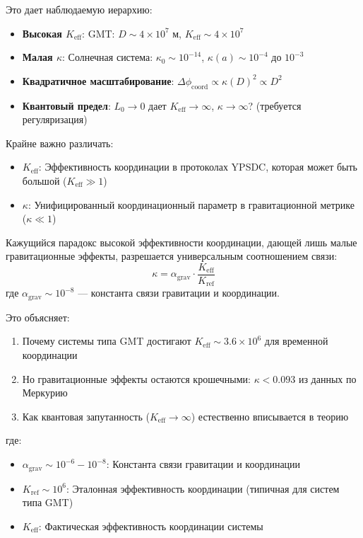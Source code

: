 \documentclass[11pt,a4paper]{article}
\begin{document}
	Это дает наблюдаемую иерархию:
	\begin{itemize}
		\item \textbf{Высокая $K_{\mathrm{eff}}$}: GMT: $D \sim 4\times10^7$ м, $K_{\mathrm{eff}} \sim 4\times10^7$
		\item \textbf{Малая $\kappa$}: Солнечная система: $\kappa_0 \sim 10^{-14}$, $\kappa(a) \sim 10^{-4}$ до $10^{-3}$
		\item \textbf{Квадратичное масштабирование}: $\Delta\phi_{\text{coord}} \propto \kappa(D)^2 \propto D^2$
		\item \textbf{Квантовый предел}: $L_0 \to 0$ дает $K_{\mathrm{eff}} \to \infty$, $\kappa \to \infty$? (требуется регуляризация)
	\end{itemize}
	
	Крайне важно различать:
	\begin{itemize}
		\item \textbf{$K_{\mathrm{eff}}$}: Эффективность координации в протоколах YPSDC, которая может быть большой ($K_{\mathrm{eff}} \gg 1$)
		\item \textbf{$\kappa$}: Унифицированный координационный параметр в гравитационной метрике ($\kappa \ll 1$)
	\end{itemize}
	
	Кажущийся парадокс высокой эффективности координации, дающей лишь малые гравитационные эффекты, разрешается универсальным соотношением связи:
	\begin{equation}
		\boxed{\kappa = \alpha_{\text{grav}} \cdot \frac{K_{\mathrm{eff}}}{K_{\text{ref}}}}
	\end{equation}
	где $\alpha_{\text{grav}} \sim 10^{-8}$ — константа связи гравитации и координации.
	
	Это объясняет:
	\begin{enumerate}
		\item Почему системы типа GMT достигают $K_{\mathrm{eff}} \sim 3.6\times10^6$ для временной координации
		\item Но гравитационные эффекты остаются крошечными: $\kappa < 0.093$ из данных по Меркурию
		\item Как квантовая запутанность ($K_{\mathrm{eff}} \to \infty$) естественно вписывается в теорию
	\end{enumerate}
	где:
	\begin{itemize}
		\item $\alpha_{\text{grav}} \sim 10^{-6} - 10^{-8}$: Константа связи гравитации и координации
		\item $K_{\text{ref}} \sim 10^6$: Эталонная эффективность координации (типичная для систем типа GMT)
		\item $K_{\mathrm{eff}}$: Фактическая эффективность координации системы
	\end{itemize}
	
\end{document}
